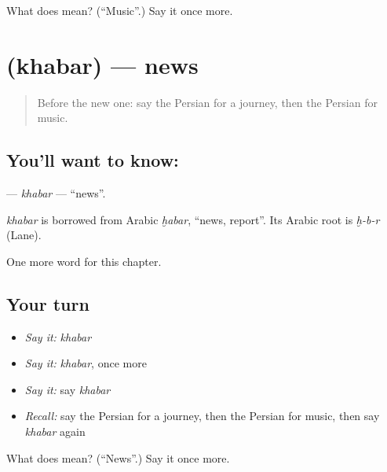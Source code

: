 \begin{tcolorbox}[breakable,colback=teal!4,colframe=teal!35!black,title={Before you move on}]
What does  mean? (\textquotedblleft{}Music\textquotedblright{}.) Say it once more.
\end{tcolorbox}
\section[\texorpdfstring{\fa{خبر} (khabar)}{خبر (khabar)}]{ (khabar) — news}

\label{lesson:FA-C78-khabar}



\begin{quote}
Before the new one: say the Persian for a journey, then the Persian for music.
\end{quote}

\subsection*{You'll want to know: }
\textbf{} — \emph{khabar} — \textquotedblleft{}news\textquotedblright{}.

\begin{cousinweb}
\emph{khabar} is borrowed from Arabic \emph{ḫabar}, \textquotedblleft{}news, report\textquotedblright{}. Its Arabic root is \emph{ḫ-b-r} (Lane).
\end{cousinweb}

\begin{grammarlens}[title={What you've built}]
One more word for this chapter.
\end{grammarlens}

\subsection*{Your turn}
\begin{itemize}
\raggedright
  \item \emph{Say it:} \emph{khabar}
  \item \emph{Say it:} \emph{khabar}, once more
  \item \emph{Say it:} say \emph{khabar}
  \item \emph{Recall:} say the Persian for a journey, then the Persian for music, then say \emph{khabar} again
\end{itemize}

\begin{tcolorbox}[breakable,colback=teal!4,colframe=teal!35!black,title={Before you move on}]
What does  mean? (\textquotedblleft{}News\textquotedblright{}.) Say it once more.
\end{tcolorbox}
